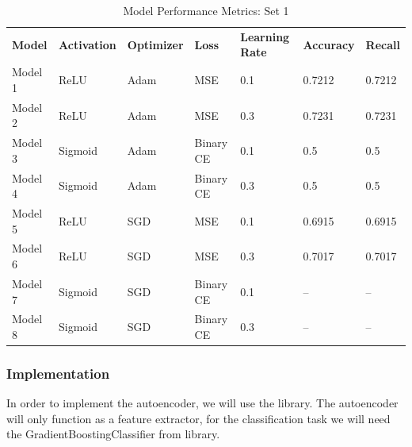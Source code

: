 \begin{table}[H]
    \centering
    \begin{tabularx}{0.7\textwidth}{
        !{\color{bordergreen}\vrule} m{1.5cm}
        !{\color{bordergreen}\vrule} m{1.5cm}
        !{\color{bordergreen}\vrule} m{1.5cm}
        !{\color{bordergreen}\vrule} m{1.5cm}
        !{\color{bordergreen}\vrule} m{1.5cm}
        !{\color{bordergreen}\vrule} m{1.5cm}
        !{\color{bordergreen}\vrule} m{1.5cm}
        !{\color{bordergreen}\vrule}}
        \hline
         \\
        \hline
        \textbf{Model} & \textbf{Activation} & \textbf{Optimizer} & \textbf{Loss} & \textbf{Learning Rate} & \textbf{Accuracy} & \textbf{Recall} \\
        \hline
        Model 1 & ReLU & Adam & MSE & 0.1 & 0.7212 & 0.7212 \\
        \hline
        Model 2 & ReLU & Adam & MSE & 0.3 & 0.7231 & 0.7231 \\
        \hline
        Model 3 & Sigmoid & Adam & Binary CE & 0.1 & 0.5 & 0.5 \\
        \hline
        Model 4 & Sigmoid & Adam & Binary CE & 0.3 & 0.5 & 0.5 \\
        \hline
        Model 5 & ReLU & SGD & MSE & 0.1 & 0.6915 & 0.6915 \\
        \hline
        Model 6 & ReLU & SGD & MSE & 0.3 & 0.7017 & 0.7017 \\
        \hline
        Model 7 & Sigmoid & SGD & Binary CE & 0.1 & -- & -- \\
        \hline
        Model 8 & Sigmoid & SGD & Binary CE & 0.3 & -- & -- \\
        \hline
    \end{tabularx}
    \caption{Model Performance Metrics: Set 1}
    \label{tab:model_performance_set1}
\end{table}








\subsubsection{Implementation}
In order to implement the autoencoder, we will use the  library. The autoencoder will only function as a feature extractor, for the classification task we will need the {GradientBoostingClassifier} from  library.\\

